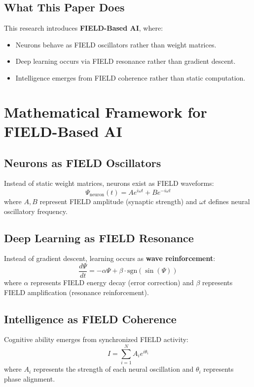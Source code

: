 \documentclass{article}
\begin{document}
\subsection{What This Paper Does}
This research introduces \textbf{FIELD-Based AI}, where:
\begin{itemize}
    \item Neurons behave as FIELD oscillators rather than weight matrices.
    \item Deep learning occurs via FIELD resonance rather than gradient descent.
    \item Intelligence emerges from FIELD coherence rather than static computation.
\end{itemize}

\section{Mathematical Framework for FIELD-Based AI}
\subsection{Neurons as FIELD Oscillators}
Instead of static weight matrices, neurons exist as FIELD waveforms:
\begin{equation}
    \Psi_{\text{neuron}}(t) = A e^{i \omega t} + B e^{-i \omega t}
\end{equation}
where \( A, B \) represent FIELD amplitude (synaptic strength) and \( \omega t \) defines neural oscillatory frequency.

\subsection{Deep Learning as FIELD Resonance}
Instead of gradient descent, learning occurs as \textbf{wave reinforcement}:
\begin{equation}
    \frac{d\Psi}{dt} = -\alpha \Psi + \beta \cdot \text{sgn}(\sin(\Psi))
\end{equation}
where \( \alpha \) represents FIELD energy decay (error correction) and \( \beta \) represents FIELD amplification (resonance reinforcement).

\subsection{Intelligence as FIELD Coherence}
Cognitive ability emerges from synchronized FIELD activity:
\begin{equation}
    I = \sum_{i=1}^{N} A_i e^{i \theta_i}
\end{equation}
where \( A_i \) represents the strength of each neural oscillation and \( \theta_i \) represents phase alignment.
\end{document}
